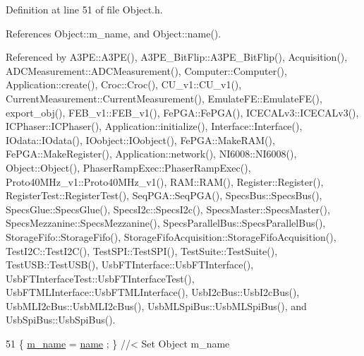Definition at line 51 of file Object.\+h.



References Object\+::m\+\_\+name, and Object\+::name().



Referenced by A3\+P\+E\+::\+A3\+P\+E(), A3\+P\+E\+\_\+\+Bit\+Flip\+::\+A3\+P\+E\+\_\+\+Bit\+Flip(), Acquisition(), A\+D\+C\+Measurement\+::\+A\+D\+C\+Measurement(), Computer\+::\+Computer(), Application\+::create(), Croc\+::\+Croc(), C\+U\+\_\+v1\+::\+C\+U\+\_\+v1(), Current\+Measurement\+::\+Current\+Measurement(), Emulate\+F\+E\+::\+Emulate\+F\+E(), export\+\_\+obj(), F\+E\+B\+\_\+v1\+::\+F\+E\+B\+\_\+v1(), Fe\+P\+G\+A\+::\+Fe\+P\+G\+A(), I\+C\+E\+C\+A\+Lv3\+::\+I\+C\+E\+C\+A\+Lv3(), I\+C\+Phaser\+::\+I\+C\+Phaser(), Application\+::initialize(), Interface\+::\+Interface(), I\+Odata\+::\+I\+Odata(), I\+Oobject\+::\+I\+Oobject(), Fe\+P\+G\+A\+::\+Make\+R\+A\+M(), Fe\+P\+G\+A\+::\+Make\+Register(), Application\+::network(), N\+I6008\+::\+N\+I6008(), Object\+::\+Object(), Phaser\+Ramp\+Exec\+::\+Phaser\+Ramp\+Exec(), Proto40\+M\+Hz\+\_\+v1\+::\+Proto40\+M\+Hz\+\_\+v1(), R\+A\+M\+::\+R\+A\+M(), Register\+::\+Register(), Register\+Test\+::\+Register\+Test(), Seq\+P\+G\+A\+::\+Seq\+P\+G\+A(), Specs\+Bus\+::\+Specs\+Bus(), Specs\+Glue\+::\+Specs\+Glue(), Specs\+I2c\+::\+Specs\+I2c(), Specs\+Master\+::\+Specs\+Master(), Specs\+Mezzanine\+::\+Specs\+Mezzanine(), Specs\+Parallel\+Bus\+::\+Specs\+Parallel\+Bus(), Storage\+Fifo\+::\+Storage\+Fifo(), Storage\+Fifo\+Acquisition\+::\+Storage\+Fifo\+Acquisition(), Test\+I2\+C\+::\+Test\+I2\+C(), Test\+S\+P\+I\+::\+Test\+S\+P\+I(), Test\+Suite\+::\+Test\+Suite(), Test\+U\+S\+B\+::\+Test\+U\+S\+B(), Usb\+F\+T\+Interface\+::\+Usb\+F\+T\+Interface(), Usb\+F\+T\+Interface\+Test\+::\+Usb\+F\+T\+Interface\+Test(), Usb\+F\+T\+M\+L\+Interface\+::\+Usb\+F\+T\+M\+L\+Interface(), Usb\+I2c\+Bus\+::\+Usb\+I2c\+Bus(), Usb\+M\+L\+I2c\+Bus\+::\+Usb\+M\+L\+I2c\+Bus(), Usb\+M\+L\+Spi\+Bus\+::\+Usb\+M\+L\+Spi\+Bus(), and Usb\+Spi\+Bus\+::\+Usb\+Spi\+Bus().


\begin{DoxyCode}
51 \{ \hyperlink{classObject_a8b83c95c705d2c3ba0d081fe1710f48d}{m\_name}  = \hyperlink{classObject_a300f4c05dd468c7bb8b3c968868443c1}{name}  ; \} \textcolor{comment}{//< Set Object m\_name}
\end{DoxyCode}
\mbox{\label{classAcquisition_a6ee040a009aa48f848b1e12434135db9}} 
